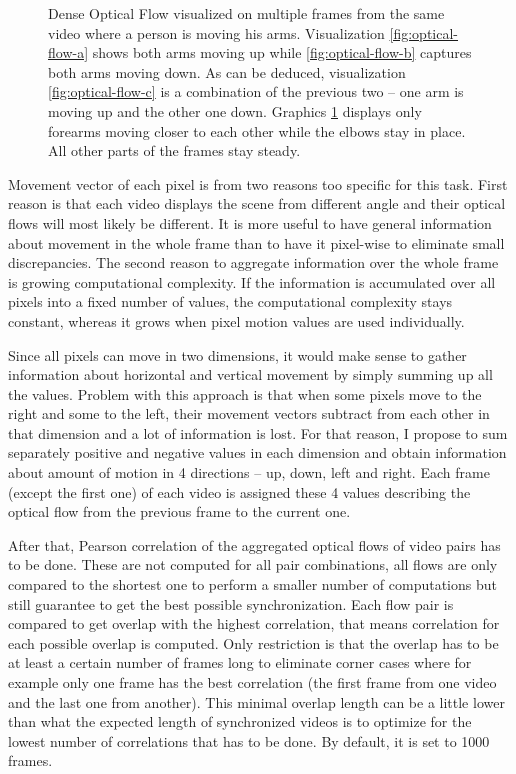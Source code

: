 \begin{figure}[!ht]
\begin{subfigure}[b]{0.24\textwidth}
        \caption{}
        \label{fig:optical-flow-d}
    \end{subfigure}
    \caption{Dense Optical Flow visualized on multiple frames from the same video where a person is moving his arms. Visualization \ref{fig:optical-flow-a} shows both arms moving up while \ref{fig:optical-flow-b} captures both arms moving down. As can be deduced, visualization \ref{fig:optical-flow-c} is a combination of the previous two -- one arm is moving up and the other one down. Graphics \ref{fig:optical-flow-d} displays only forearms moving closer to each other while the elbows stay in place. All other parts of the frames stay steady.}
    \label{fig:optical-flow}
\end{figure}

Movement vector of each pixel is from two reasons too specific for this task. First reason is that each video displays the scene from different angle and their optical flows will most likely be different. It is more useful to have general information about movement in the whole frame than to have it pixel-wise to eliminate small discrepancies. The second reason to aggregate information over the whole frame is growing computational complexity. If the information is accumulated over all pixels into a fixed number of values, the computational complexity stays constant, whereas it grows when pixel motion values are used individually. 

Since all pixels can move in two dimensions, it would make sense to gather information about horizontal and vertical movement by simply summing up all the values. Problem with this approach is that when some pixels move to the right and some to the left, their movement vectors subtract from each other in that dimension and a lot of information is lost. For that reason, I propose to sum separately positive and negative values in each dimension and obtain information about amount of motion in 4 directions -- up, down, left and right. Each frame (except the first one) of each video is assigned these 4 values describing the optical flow from the previous frame to the current one.

After that, Pearson correlation of the aggregated optical flows of video pairs has to be done. These are not computed for all pair combinations, all flows are only compared to the shortest one to perform a smaller number of computations but still guarantee to get the best possible synchronization. Each flow pair is compared to get overlap with the highest correlation, that means correlation for each possible overlap is computed. Only restriction is that the overlap has to be at least a certain number of frames long to eliminate corner cases where for example only one frame has the best correlation (the first frame from one video and the last one from another). This minimal overlap length can be a little lower than what the expected length of synchronized videos is to optimize for the lowest number of correlations that has to be done. By default, it is set to 1000 frames.

